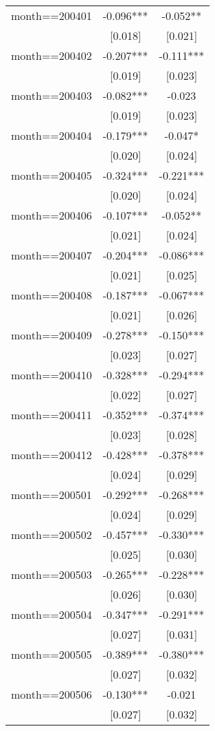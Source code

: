 \documentclass[]{article}
\begin{document}
\begin{tabular}{lcc}
month==200401 & -0.096*** & -0.052** \\
 & [0.018] & [0.021] \\
month==200402 & -0.207*** & -0.111*** \\
 & [0.019] & [0.023] \\
month==200403 & -0.082*** & -0.023 \\
 & [0.019] & [0.023] \\
month==200404 & -0.179*** & -0.047* \\
 & [0.020] & [0.024] \\
month==200405 & -0.324*** & -0.221*** \\
 & [0.020] & [0.024] \\
month==200406 & -0.107*** & -0.052** \\
 & [0.021] & [0.024] \\
month==200407 & -0.204*** & -0.086*** \\
 & [0.021] & [0.025] \\
month==200408 & -0.187*** & -0.067*** \\
 & [0.021] & [0.026] \\
month==200409 & -0.278*** & -0.150*** \\
 & [0.023] & [0.027] \\
month==200410 & -0.328*** & -0.294*** \\
 & [0.022] & [0.027] \\
month==200411 & -0.352*** & -0.374*** \\
 & [0.023] & [0.028] \\
month==200412 & -0.428*** & -0.378*** \\
 & [0.024] & [0.029] \\
month==200501 & -0.292*** & -0.268*** \\
 & [0.024] & [0.029] \\
month==200502 & -0.457*** & -0.330*** \\
 & [0.025] & [0.030] \\
month==200503 & -0.265*** & -0.228*** \\
 & [0.026] & [0.030] \\
month==200504 & -0.347*** & -0.291*** \\
 & [0.027] & [0.031] \\
month==200505 & -0.389*** & -0.380*** \\
 & [0.027] & [0.032] \\
month==200506 & -0.130*** & -0.021 \\
 & [0.027] & [0.032] \\

\end{tabular}
\end{document}
